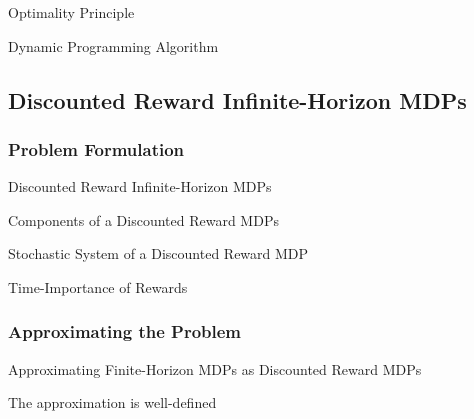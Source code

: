 \documentclass[11pt,a4paper]{article}
\begin{document}
  \begin{theorem}{Optimality Principle}

  \end{theorem}

  \begin{remark}{Dynamic Programming Algorithm}

  \end{remark}

\subsection{Discounted Reward Infinite-Horizon MDPs} %

\subsubsection{Problem Formulation} %

  \begin{definition}{Discounted Reward Infinite-Horizon MDPs}

  \end{definition}

  \begin{proposition}{Components of a Discounted Reward MDPs}
  \end{proposition}

  \begin{proposition}{Stochastic System of a Discounted Reward MDP}

  \end{proposition}

  \begin{remark}{Time-Importance of Rewards}

  \end{remark}

\subsubsection{Approximating the Problem} %

  \begin{proposition}{Approximating Finite-Horizon MDPs as Discounted Reward MDPs}

  \end{proposition}

  \begin{remark}{The approximation is well-defined}

  \end{remark}
\end{document}
